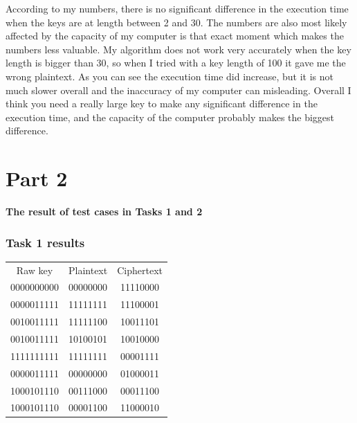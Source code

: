 \documentclass[12pt, letterpaper]{article}
\begin{document}
According to my numbers, there is no significant difference in the execution time when the keys are at length between 2 and 30. The numbers are also most likely affected by the capacity of my computer is that exact moment which makes the numbers less valuable. My algorithm does not work very accurately when the key length is bigger than 30, so when I tried with a key length of 100 it gave me the wrong plaintext. As you can see the execution time did increase, but it is not much slower overall and the inaccuracy of my computer can misleading. Overall I think you need a really large key to make any significant difference in the execution time, and the capacity of the computer probably makes the biggest difference.
\newpage
\section*{Part 2}
\textbf{The result of test cases in Tasks 1 and 2}

\subsubsection*{Task 1 results}
\begin{center}
\begin{tabular}{ |c|c|c| } 
 \hline
 Raw key & Plaintext & Ciphertext \\
 0000000000 & 00000000 & 11110000 \\ 
 0000011111 & 11111111 & 11100001 \\ 
 0010011111 & 11111100 & 10011101 \\ 
 0010011111 & 10100101 & 10010000 \\ 
 1111111111 & 11111111 & 00001111 \\
 0000011111 & 00000000 & 01000011 \\
 1000101110 & 00111000 & 00011100 \\
 1000101110 & 00001100 & 11000010 \\
 \hline
\end{tabular}
\end{center}
\end{document}
